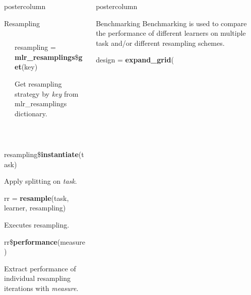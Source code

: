 \documentclass{beamer}
\newlength{\columnheight} %
\begin{document}
\begin{frame}[fragile]{}
\begin{columns}
\begin{column}{.31\textwidth}
\begin{beamercolorbox}[center]{postercolumn}
\begin{minipage}{.98\textwidth}
{\begin{myblock}{Resampling}
\begin{minipage}{\textwidth}
\begin{columns}[T]
\begin{column}{0.2\textwidth}
								\end{column}
								\begin{column}{0.8\textwidth}
										\begin{codebox}
										resampling = \textbf{mlr\_resamplings}\$\textbf{get}(key)
										\end{codebox}
										\hspace*{1ex}Get resampling strategy by \textit{key} from mlr\_resamplings \hspace*{1ex}dictionary.
								\end{column}
							\end{columns}
						\end{minipage}
						\\[\baselineskip]
						\begin{codebox}
							resampling\$\textbf{instantiate}(task)
						\end{codebox}
						\hspace*{1ex}Apply splitting on \textit{task}.
						\\
						\begin{codebox}
							rr = \textbf{resample}(task, learner, resampling)
						\end{codebox}
						\hspace*{1ex}Executes resampling.
						\\
						\begin{codebox}
							rr\$\textbf{performance}(measure)
						\end{codebox}
						\hspace*{1ex}Extract performance of individual resampling iterations with \textit{measure}.
					\end{myblock}\vfill
				}
			\end{minipage}
		\end{beamercolorbox}
	\end{column}
	\begin{column}{.31\textwidth}
		\begin{beamercolorbox}[center]{postercolumn}
			\begin{minipage}{.98\textwidth}
				\parbox[t][\columnheight]{\textwidth}{
					\begin{myblock}{Benchmarking}
						Benchmarking is used to compare the performance of different learners on multiple task and/or different resampling schemes.
						\\
						\begin{codeboxmultiline}[width=21.95cm]
							design = \textbf{expand\_grid}(\\

\end{codeboxmultiline}
\end{myblock}}
\end{minipage}
\end{beamercolorbox}
\end{column}
\end{columns}
\end{frame}
\end{document}

